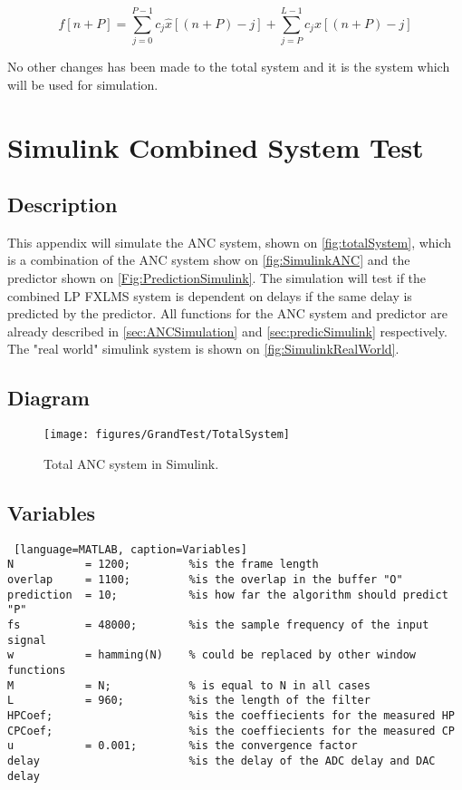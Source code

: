 \begin{equation}\label{eq:CPExpandedapp}
f[n+P]=\sum^{P-1}_{j=0}c_j\hat{x}[(n+P)-j]+\sum^{L-1}_{j=P}c_jx[(n+P)-j]
\end{equation}

No other changes has been made to the total system and it is the system which will be used for simulation.

\newpage
\section{Simulink Combined System Test} \label{sec:SimulinkTotalSystem}

\subsection{Description}
This appendix will simulate the ANC system, shown on \autoref{fig:totalSystem}, which is a combination of the ANC system show on \autoref{fig:SimulinkANC} and the predictor shown on \autoref{Fig:PredictionSimulink}. The simulation will test if the combined LP FXLMS system is dependent on delays if the same delay is predicted by the predictor. All functions for the ANC system and predictor are already described in \autoref{sec:ANCSimulation} and \autoref{sec:predicSimulink} respectively. The "real world" simulink system is shown on \autoref{fig:SimulinkRealWorld}.

\subsection{Diagram}
\begin{figure}[H]
	\centering
	\texttt{[image: figures/GrandTest/TotalSystem]}
	\caption{Total ANC system in Simulink.}
	\label{fig:SimulinktotalSystem}
\end{figure}


\subsection{Variables}
\begin{lstlisting} [language=MATLAB, caption=Variables]
N 			= 1200; 		%is the frame length 
overlap 	= 1100;			%is the overlap in the buffer "O"
prediction 	= 10; 			%is how far the algorithm should predict "P"
fs 			= 48000; 		%is the sample frequency of the input signal 
w           = hamming(N)	% could be replaced by other window functions
M           = N;			% is equal to N in all cases
L  			= 960;  	 	%is the length of the filter
HPCoef;  		 			%is the coeffiecients for the measured HP
CPCoef;  		 			%is the coeffiecients for the measured CP
u  			= 0.001;		%is the convergence factor
delay 			 			%is the delay of the ADC delay and DAC delay
\end{lstlisting}

